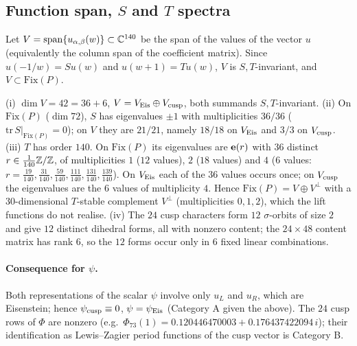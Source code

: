 \subsection{Function span, $S$ and $T$ spectra}\label{sec:spec}
Let $V=\mathrm{span}\{u_{\alpha,\beta}(w)\}\subset\mathbb{C}^{140}$ be the span of the values of the vector $u$ (equivalently the column span of the coefficient
matrix). Since $u(-1/w)=Su(w)$ and $u(w+1)=Tu(w)$, $V$ is $S,T$-invariant, and $V\subset\mathrm{Fix}(P)$.
\begin{proposition}\label{prop:spec}
(i) $\dim V=42=36+6$, $V=V_{\rm Eis}\oplus V_{\rm cusp}$, both summands $S,T$-invariant. (ii) On $\mathrm{Fix}(P)$ ($\dim72$), $S$ has eigenvalues
$\pm1$ with multiplicities $36/36$ ($\mathrm{tr}\,S|_{\mathrm{Fix}(P)}=0$); on $V$ they are $21/21$, namely $18/18$ on $V_{\rm Eis}$ and $3/3$ on
$V_{\rm cusp}$. (iii) $T$ has order $140$. On $\mathrm{Fix}(P)$ its eigenvalues are $\mathbf{e}(r)$ with $36$ distinct $r\in\tfrac1{140}\mathbb{Z}/\mathbb{Z}$, of multiplicities
$1$ ($12$ values), $2$ ($18$ values) and $4$ ($6$ values: $r=\tfrac{19}{140},\tfrac{31}{140},\tfrac{59}{140},\tfrac{111}{140},\tfrac{131}{140},\tfrac{139}{140}$).
On $V_{\rm Eis}$ each of the $36$ values occurs once; on $V_{\rm cusp}$ the eigenvalues are the $6$ values of multiplicity $4$. Hence
$\mathrm{Fix}(P)=V\oplus V^\perp$ with a $30$-dimensional $T$-stable complement $V^\perp$ (multiplicities $0,1,2$), which the lift functions do not realise.
(iv) The $24$ cusp characters form $12$ $\sigma$-orbits of size $2$ and give $12$ distinct dihedral forms, all with nonzero content; the
$24\times48$ content matrix has rank $6$, so the $12$ forms occur only in $6$ fixed linear combinations.
\end{proposition}

\paragraph{Consequence for $\psi$.} Both representations of the scalar $\psi$ involve only $u_L$ and $u_R$, which are Eisenstein; hence
$\psi_{\rm cusp}\equiv0$, $\psi=\psi_{\rm Eis}$ (Category A given the above). The $24$ cusp rows of $\Phi$ are nonzero (e.g.\
$\Phi_{73}(1)=0.120446470003+0.176437422094\,i$); their identification as Lewis--Zagier period functions of the cusp vector is Category B.
